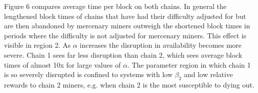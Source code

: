 \documentclass[10pt, preprint]{aastex}
\begin{document}
Figure 6 compares average time per block on both chains.  In general the lengthened block times of chains that have had their difficulty adjusted for but are then abandoned by mercenary miners outweigh the shortened block times in periods where the difficulty is not adjusted for mercenary miners.  This effect is visible in region 2.  As $\alpha$ increases the disruption in availability becomes more severe.  Chain 1 sees far less disruption than chain 2, which sees average block times of almost 10x for large values of $\alpha$.  The parameter region in which chain 1 is so severely disrupted is confined to systems with low $\beta_2$ and low relative rewards to chain 2 miners, e.g. when chain 2 is the most susceptible to dying out.
\begin{figure}
	\centering
	\qquad
	\qquad
	\qquad
\end{figure}
\end{document}
